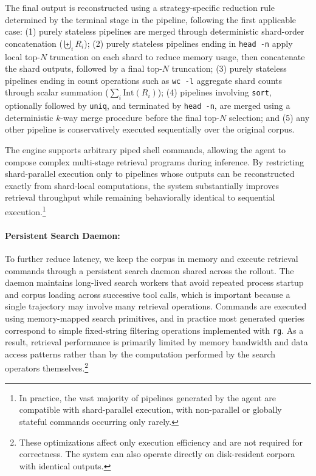 \documentclass{llmxive}
\begin{document}
The final output is reconstructed using a strategy-specific reduction rule determined by the terminal stage in the pipeline, following the first applicable case: (1) purely stateless pipelines are merged through deterministic shard-order concatenation ($\biguplus_i R_i$); (2) purely stateless pipelines ending in \texttt{head -n} apply local top-$N$ truncation on each shard to reduce memory usage, then concatenate the shard outputs, followed by a final top-$N$ truncation; (3) purely stateless pipelines ending in count operations such as \texttt{wc -l} aggregate shard counts through scalar summation ($\sum_i \mathrm{Int}(R_i)$); (4) pipelines involving \texttt{sort}, optionally followed by \texttt{uniq}, and terminated by \texttt{head -n}, are merged using a deterministic $k$-way merge procedure \citep{cormen2001algorithms} before the final top-$N$ selection; and (5) any other pipeline is conservatively executed sequentially over the original corpus.

The engine supports arbitrary piped shell commands, allowing the agent to compose complex multi-stage retrieval programs during inference. By restricting shard-parallel execution only to pipelines whose outputs can be reconstructed exactly from shard-local computations, the system substantially improves retrieval throughput while remaining behaviorally identical to sequential execution.\footnote{In practice, the vast majority of pipelines generated by the agent are compatible with shard-parallel execution, with non-parallel or globally stateful commands occurring only rarely.}


\paragraph{Persistent Search Daemon:}
To further reduce latency, we keep the corpus in memory and execute retrieval commands through a persistent search daemon shared across the rollout. The daemon maintains long-lived search workers that avoid repeated process startup and corpus loading across successive tool calls, which is important because a single trajectory may involve many retrieval operations. Commands are executed using memory-mapped search primitives, and in practice most generated queries correspond to simple fixed-string filtering operations implemented with \texttt{rg}. As a result, retrieval performance is primarily limited by memory bandwidth and data access patterns rather than by the computation performed by the search operators themselves.\footnote{These optimizations affect only execution efficiency and are not required for correctness. The system can also operate directly on disk-resident corpora with identical outputs.}
\end{document}
